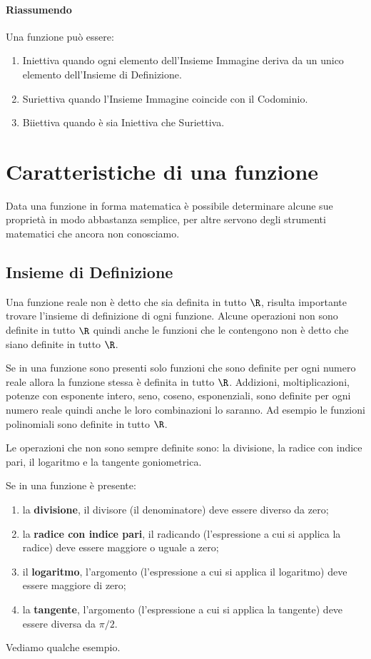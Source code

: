 \paragraph{Riassumendo}

Una funzione può essere:
\begin{enumerate} [nosep]
\item Iniettiva quando ogni elemento dell'Insieme Immagine deriva da un unico 
elemento dell'Insieme di Definizione.
\item Suriettiva quando l'Insieme Immagine coincide con il Codominio.
\item Biiettiva quando è sia Iniettiva che Suriettiva.
\end{enumerate}

\section{Caratteristiche di una funzione}
\label{sec:funzioni2_caratteristiche}

Data una funzione in forma matematica è possibile determinare alcune sue 
proprietà in modo abbastanza semplice, per altre servono degli strumenti 
matematici che ancora non conosciamo.

\subsection{Insieme di Definizione}

Una funzione reale non è detto che sia definita in tutto \(\R\), risulta 
importante trovare l'insieme di definizione di ogni funzione.
Alcune operazioni non sono definite in tutto \(\R\) quindi anche le funzioni 
che le contengono non è detto che siano definite in tutto \(\R\). 

Se in una funzione sono presenti solo funzioni che sono definite per ogni 
numero reale allora la funzione stessa è definita in tutto \(\R\). 
Addizioni, moltiplicazioni, potenze con esponente intero, seno, coseno, 
esponenziali, sono definite per ogni numero reale quindi anche le loro 
combinazioni lo saranno.
Ad esempio le funzioni polinomiali sono definite in tutto \(\R\). 

Le operazioni che non sono sempre definite sono: 
la divisione, la radice con indice pari, il logaritmo e la tangente 
goniometrica.

Se in una funzione è presente:
\begin{enumerate} [noitemsep]
\item la \textbf{divisione}, il divisore (il denominatore) deve essere diverso 
da zero;
\item la \textbf{radice con indice pari}, il radicando (l'espressione a cui 
si applica la radice) deve essere maggiore o uguale a zero;
\item il \textbf{logaritmo}, l'argomento (l'espressione a cui si applica il 
logaritmo) deve essere maggiore di zero;
\item la \textbf{tangente}, l'argomento (l'espressione a cui si applica la 
tangente) deve essere diversa da \(\pi/2\).
\end{enumerate}
Vediamo qualche esempio.

